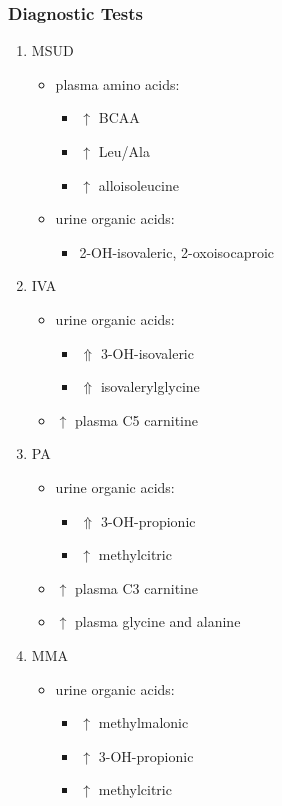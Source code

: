 \documentclass{scrartcl}
\begin{document}
\subsubsection{Diagnostic Tests}
\label{sec:orge5b485c}
\begin{enumerate}
\item MSUD
\label{sec:org7928eb8}
\begin{itemize}
\item plasma amino acids:
\begin{itemize}
\item \(\uparrow\) BCAA
\item \(\uparrow\) Leu/Ala
\item \(\uparrow\) alloisoleucine
\end{itemize}
\item urine organic acids:
\begin{itemize}
\item 2-OH-isovaleric, 2-oxoisocaproic
\end{itemize}
\end{itemize}

\item IVA
\label{sec:orgc98543f}
\begin{itemize}
\item urine organic acids:
\begin{itemize}
\item \(\Uparrow\) 3-OH-isovaleric
\item \(\Uparrow\) isovalerylglycine
\end{itemize}
\item \(\uparrow\) plasma C5 carnitine
\end{itemize}

\item PA
\label{sec:orgaf52e3e}
\begin{itemize}
\item urine organic acids:
\begin{itemize}
\item \(\Uparrow\) 3-OH-propionic
\item \(\uparrow\) methylcitric
\end{itemize}

\item \(\uparrow\) plasma C3 carnitine
\item \(\uparrow\) plasma glycine and alanine
\end{itemize}

\item MMA
\label{sec:org6706c8d}
\begin{itemize}
\item urine organic acids:
\begin{itemize}
\item \(\uparrow\) methylmalonic
\item \(\uparrow\) 3-OH-propionic
\item \(\uparrow\) methylcitric
\end{itemize}


\end{itemize}
\end{enumerate}
\end{document}
